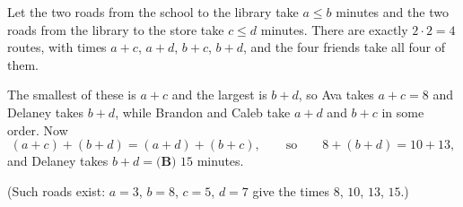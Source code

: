 Let the two roads from the school to the library take $a\le b$ minutes and the two roads from the library to the store take $c\le d$ minutes. There are exactly $2\cdot2=4$ routes, with times $a+c$, $a+d$, $b+c$, $b+d$, and the four friends take all four of them.

The smallest of these is $a+c$ and the largest is $b+d$, so Ava takes $a+c=8$ and Delaney takes $b+d$, while Brandon and Caleb take $a+d$ and $b+c$ in some order. Now
\[(a+c)+(b+d)=(a+d)+(b+c),\qquad\text{so}\qquad 8+(b+d)=10+13,\]
and Delaney takes $b+d=\boxed{\textbf{(B) }15}$ minutes.

(Such roads exist: $a=3$, $b=8$, $c=5$, $d=7$ give the times $8$, $10$, $13$, $15$.)
